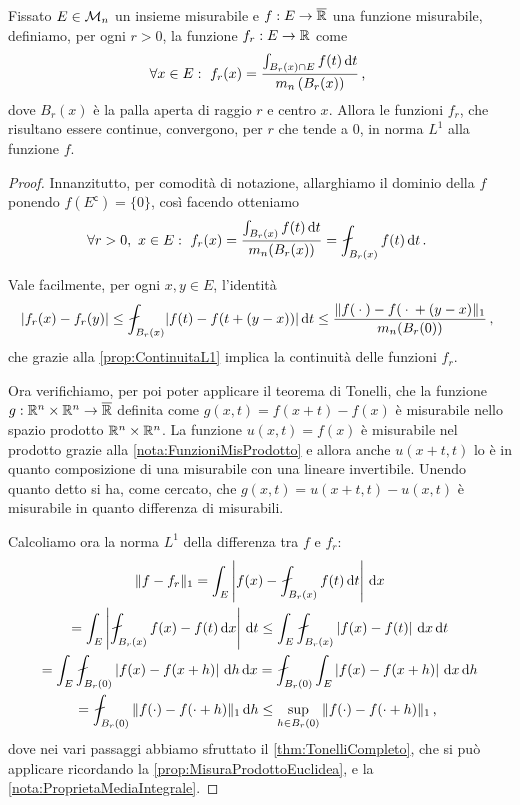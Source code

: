 \begin{lemma}\label{lemma:ContinuitaL1Palle}
	Fissato $E\in\mathcal M_n$ un insieme misurabile e $f:E\to\overline{\mathbb R}$ una funzione misurabile, definiamo, per ogni $r>0$, la funzione $f_r:E\to\mathbb R$ come
	\begin{equation*}
		\forall x\in E:\ f_r(x)=\frac{\int_{B_r(x)\cap E}f(t)\,\mathrm d t}{m_n\left(B_r(x)\right)}\, \text{, }
	\end{equation*}
	dove $B_r(x)$ è la palla aperta di raggio $r$ e centro $x$.
	Allora le funzioni $f_r$, che risultano essere continue, convergono, per $r$ che tende a $0$, in norma $L^1$ alla funzione $f$.
\end{lemma}
\begin{proof}
	Innanzitutto, per comodità di notazione, allarghiamo il dominio della $f$ ponendo $f(E^{\mathsf c})=\{0\}$, così facendo otteniamo
	\begin{equation*}
		\forall r>0,\ x\in E:\ f_r(x)=\frac{\int_{B_r(x)}f(t)\de t}{m_n(B_r(x))}=\aint_{B_r(x)} f(t)\de t \punto
	\end{equation*}

	Vale facilmente, per ogni $x,y\in E$, l'identità
	\begin{equation*}
		\lvert f_r(x)-f_r(y)\rvert %
		\le \aint_{B_r(x)}\lvert f(t)-f(t+(y-x))\rvert \de t \le \frac{ \LNorm{f({}\cdot{})-f({}\cdot{}+(y-x)} }{ m_n(B_r(0)) } \virgola
	\end{equation*}
	che grazie alla \cref{prop:ContinuitaL1} implica la continuità delle funzioni $f_r$.
	
	Ora verifichiamo, per poi poter applicare il teorema di Tonelli, che la funzione $g:\mathbb R^n\times\mathbb R^n\to\overline{\mathbb R}$ definita come $g(x,t)=f(x+t)-f(x)$ è misurabile nello spazio prodotto $\mathbb R^n\times\mathbb R^n$. 
	La funzione $u(x,t)=f(x)$ è misurabile nel prodotto grazie alla \cref{nota:FunzioniMisProdotto} e allora anche $u(x+t,t)$ lo è in quanto composizione di una misurabile con una lineare invertibile. Unendo quanto detto si ha, come cercato, che $g(x,t)=u(x+t,t)-u(x,t)$ è misurabile in quanto differenza di misurabili.
	
	Calcoliamo ora la norma $L^1$ della differenza tra $f$ e $f_r$:
	\begin{multline}\label{eq:ContinuitaPalleDis}
		\LNorm{f-f_r}=\int_E \left\lvert f(x)-\aint_{B_r(x)}f(t)\de t\right\rvert\de x\\
		=\int_E\left\lvert\aint_{B_r(x)}f(x)-f(t)\de x\right\rvert\de t\le \int_E\aint_{B_r(x)}\left\lvert f(x)-f(t)\right\rvert\de x\de t\\
		=\int_E\aint_{B_r(0)}\left\lvert f(x)-f(x+h)\right\rvert\de h\de x
		=\aint_{B_r(0)}\int_E \left\lvert f(x)-f(x+h)\right\rvert\de x\de h\\
		= \aint_{B_r(0)}\LNorm{f(\cdot)-f(\cdot+h)}\de h\le \sup_{h\in B_r(0)} \LNorm{f(\cdot)-f(\cdot+h)}\virgola
	\end{multline}
	dove nei vari passaggi abbiamo sfruttato il \cref{thm:TonelliCompleto}, che si può applicare ricordando la \cref{prop:MisuraProdottoEuclidea}, e la \cref{nota:ProprietaMediaIntegrale}.
	

\end{proof}
